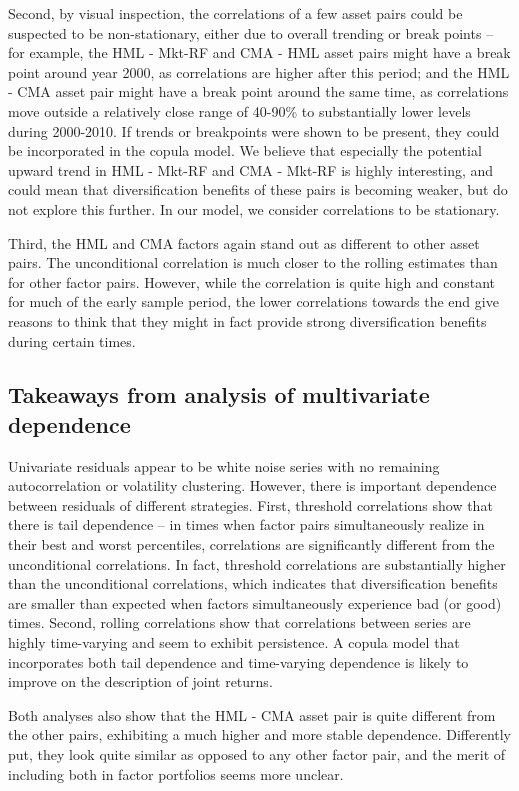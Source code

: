 Second, by visual inspection, the correlations of a few asset pairs could be suspected to be non-stationary, either due to overall trending or break points -- for example, the HML - Mkt-RF and CMA - HML asset pairs might have a break point around year 2000, as correlations are higher after this period; and the HML - CMA asset pair might have a break point around the same time, as correlations move outside a relatively close range of 40-90\% to substantially lower levels during 2000-2010. If trends or breakpoints were shown to be present, they could be incorporated in the copula model. We believe that especially the potential upward trend in HML - Mkt-RF and CMA - Mkt-RF is highly interesting, and could mean that diversification benefits of these pairs is becoming weaker, but do not explore this further. In our model, we consider correlations to be stationary.

Third, the HML and CMA factors again stand out as different to other asset pairs. The unconditional correlation is much closer to the rolling estimates than for other factor pairs. However, while the correlation is quite high and constant for much of the early sample period, the lower correlations towards the end give reasons to think that they might in fact provide strong diversification benefits during certain times.

\subsection{Takeaways from analysis of multivariate dependence}
Univariate residuals appear to be white noise series with no remaining autocorrelation or volatility clustering. However, there is important dependence between residuals of different strategies. First, threshold correlations show that there is tail dependence -- in times when factor pairs simultaneously realize in their best and worst percentiles, correlations are significantly different from the unconditional correlations. In fact, threshold correlations are substantially higher than the unconditional correlations, which indicates that diversification benefits are smaller than expected when factors simultaneously experience bad (or good) times. Second, rolling correlations show that correlations between series are highly time-varying and seem to exhibit persistence. A copula model that incorporates both tail dependence and time-varying dependence is likely to improve on the description of joint returns.

Both analyses also show that the HML - CMA asset pair is quite different from the other pairs, exhibiting a much higher and more stable dependence. Differently put, they look quite similar as opposed to any other factor pair, and the merit of including both in factor portfolios seems more unclear.